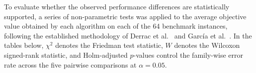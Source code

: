 \documentclass[preprint,12pt]{elsarticle}
\begin{document}



To evaluate whether the observed performance differences are statistically
supported, a series of non-parametric tests was applied to the average
objective value obtained by each algorithm on each of the 64 benchmark
instances, following the established methodology of Derrac
et al.~\cite{DERRAC20113} and Garc\'{i}a et al.~\cite{GARCIA20102044}. In the
tables below, $\chi^2$ denotes the Friedman test statistic, $W$ denotes the
Wilcoxon signed-rank statistic, and Holm-adjusted $p$-values control the
family-wise error rate across the five pairwise comparisons at $\alpha = 0.05$.
\end{document}
